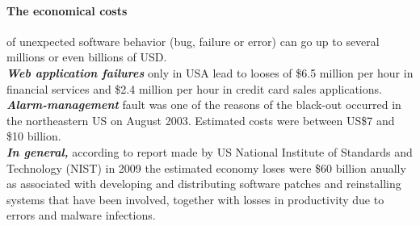 \paragraph{The economical costs} of unexpected software behavior (bug, failure or error) can go up to several millions or even billions of USD. \\
\textit{\textbf{Web application failures}} only in USA lead to looses of \$6.5 million per hour in financial services and \$2.4 million per hour in credit card sales applications\cite{Lecture1}. \\
\textit{\textbf{Alarm-management}} fault was one of the reasons of the black-out occurred in the northeastern US on August 2003. Estimated costs were between US\$7 and \$10 billion\cite{costOfErrors}.\\
\textit{\textbf{In general,}} according to report made by US National Institute of Standards and Technology (NIST) in 2009 the estimated economy loses  were \$60 billion anually as associated with developing and distributing software patches and reinstalling systems that have been involved, together with losses in productivity due to errors and malware infections\cite{costOfErrors}.\\








